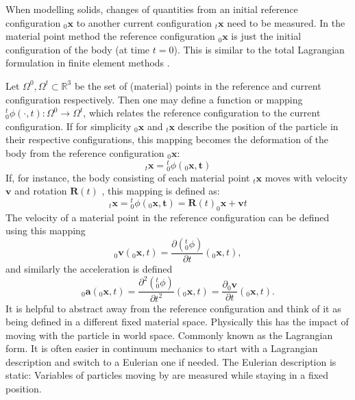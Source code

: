 \documentclass[m,times]{cgMA}
\begin{document}
When modelling solids, changes of quantities from an initial reference configuration $_0\boldsymbol{x}$ to another current configuration $_t\boldsymbol{x}$ need to be measured. In the material point method the reference configuration $_0\boldsymbol{x}$ is just the initial configuration of the body (at time $t=0$). This is similar to the total Lagrangian formulation in finite element methods \cite{bathe2006finite}.

Let $\Omega ^ { 0 } , \Omega ^ { t } \subset \mathbb { R } ^ {  { 3 } }$ be the set of (material) points in the reference and current configuration respectively.  Then one may define a function or mapping ${^t_0}\phi ( \cdot , t ) : \Omega ^ { 0 } \rightarrow \Omega ^ { t }$, which relates the reference configuration to the current configuration. If for simplicity $_0\boldsymbol{x}$ and $_t\boldsymbol{{x}}$ describe the position of the particle in their respective configurations, this mapping becomes the deformation of the body from the reference configuration $_0\boldsymbol{x}$:
\begin{equation}
  _t\boldsymbol{x} =  {^t_0}\phi ( _0\boldsymbol{x} , \boldsymbol { t } )
\end{equation}
If, for instance, the body consisting of each material point $_t\boldsymbol{x}$ moves with velocity $\boldsymbol{v}$ and rotation $\boldsymbol{R}(t)$ , this mapping is defined as:
\begin{equation}\label{eq:rigid}
  _t\boldsymbol{{x}} = {^t_0}\phi ( _0\boldsymbol{x} , \boldsymbol { t } ) = \boldsymbol{R}(t)_0\boldsymbol{x}+\boldsymbol{v}t
\end{equation}
The velocity of a material point in the reference configuration can be defined using this mapping
\begin{equation}\label{eq:velocity}
  _0\boldsymbol{v}(_0\boldsymbol{x},t) = \frac{\partial ({^t_0}\phi)}{\partial t}(_0\boldsymbol{x},t),
\end{equation}
and similarly the acceleration is defined
\begin{equation}
  _0\boldsymbol{a}(_0\boldsymbol{x},t) = \frac{\partial^2 ({^t_0}\phi)}{\partial t^2}(_0\boldsymbol{x},t) = \frac{\partial _0\boldsymbol{v}}{\partial t}(_0\boldsymbol{x},t).
\end{equation}
It is helpful to abstract away from the reference configuration and think of it as being defined in a different fixed material space. Physically this has the impact of moving with the particle in world space. Commonly known as the Lagrangian form. It is often easier in continuum mechanics to start with a Lagrangian description and switch to a Eulerian one if needed. The Eulerian description is static: Variables of particles moving by are measured while staying in a fixed position.
\end{document}
